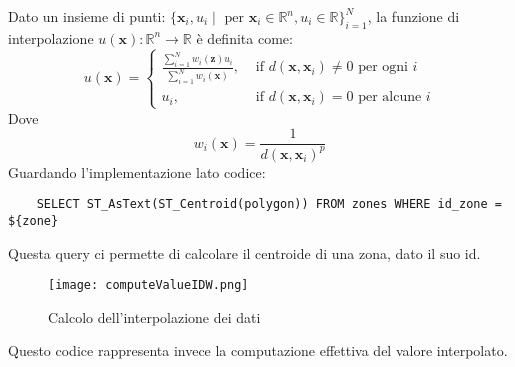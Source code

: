 \documentclass[../../Report.tex]{subfiles}
\begin{document}
    Dato un insieme di punti:  
    $ \{\mathbf{x}_i, u_i \mid \text{ per } \mathbf{x}_i \in \mathbb{R}^n, u_i \in \mathbb{R}\}_{i=1}^N $, la funzione di interpolazione $u(\mathbf{x}): \mathbb{R}^n \rightarrow \mathbb{R}$ è definita come:
    $$
    u(\mathbf{x})= 
    \begin{cases}
      \frac{\sum_{i=1}^N w_i(\mathbf{z}) u_i}{\sum_{i=1}^N w_i(\mathbf{x})},
       & \text { if } d(\mathbf{x}, \mathbf{x}_i) \neq 0 \text { per ogni  } i \\
      u_i, & \text{ if } d(\mathbf{x}, \mathbf{x}_i)=0 \text{ per alcune } i
    \end{cases}
    $$
    Dove
    $$
    w_i(\mathbf{x})=\frac{1}{d\left(\mathbf{x}, \mathbf{x}_i\right)^p}
    $$
    Guardando l'implementazione lato codice:
    \begin{lstlisting}
    SELECT ST_AsText(ST_Centroid(polygon)) FROM zones WHERE id_zone = ${zone}
    \end{lstlisting}
    Questa query ci permette di calcolare il centroide di una zona, dato il suo id.\\
    \begin{figure}[H]
      \texttt{[image: computeValueIDW.png]}
      \centering
      \caption{Calcolo dell'interpolazione dei dati}
      \label{fig:query2}
    \end{figure}
    Questo codice rappresenta invece la computazione effettiva del valore interpolato.\\
\end{document}
